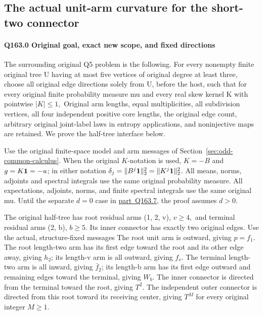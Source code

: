 \subsection{The actual unit-arm curvature for the short-two connector}\label{proof:Q5-C163}
\paragraph{Q163.0 Original goal, exact new scope, and fixed directions}

The surrounding original Q5 problem is the following. For every nonempty finite
original tree U having at most five vertices of original degree at least three,
choose all original edge directions solely from U, before the host, such that
for every original finite probability measure mu and every real skew kernel K
with pointwise \(|K|\le 1,\allowbreak \)
Original arm lengths, equal multiplicities, all subdivision vertices, all four
independent positive core lengths, the original edge count, arbitrary original
joint-label laws in entropy applications, and noninjective maps are retained.
We prove the half-tree interface below.

Use the original finite-space model and arm messages of
Section~\ref{sec:odd-common-calculus}.
When the original \(K\)-notation is used, \(K=-B\) and
\(g=K\mathbf1=-u\); in either notation
\(\delta_j=\|B^j\mathbf1\|_2^2=\|K^j\mathbf1\|_2^2\).
All means, norms, adjoints and spectral integrals use the same
original probability measure.
All expectations, adjoints, norms, and finite spectral integrals use the same
original mu. Until the separate $d=0$ case in \mbox{\hyperref[part:Q163.7]{part Q163.7}}, the proof assumes \(d>0.\)

The original half-tree has root residual arms (1, 2, v), \(v\ge 4,\allowbreak \) and terminal
residual arms (2, b), \(b\ge 5.\) Its inner connector has exactly two original edges.
Use the actual, structure-fixed messages
The root unit arm is outward, giving \(p=f_1.\) The root length-two arm has its
first edge toward the root and its other edge away, giving \(h_2\); its length-v
arm is all outward, giving \(f_v.\) The terminal length-two arm is all inward,
giving \(\bar f_2\); its length-b arm has its first edge outward and remaining edges
toward the terminal, giving \(W_b.\) The inner connector is directed from the
terminal toward the root, giving \(T^2.\) The independent outer connector is
directed from this root toward its receiving center, giving \(T^M\) for every
original integer \(M\ge 1.\)

